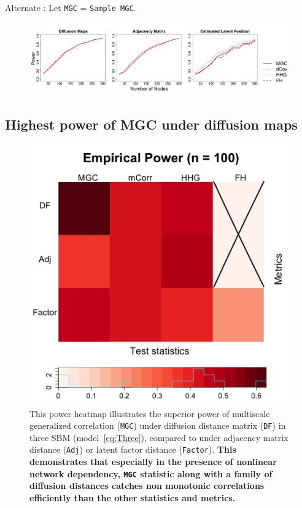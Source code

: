 \documentclass[12pt]{article}
\begin{document}
Alternate : Let \texttt{MGC} = \texttt{Sample MGC}. 

\begin{figure}[h]
	\centering
\includegraphics[width=\linewidth]{../Figure/twoSBM_simple.pdf}	
\end{figure}


\newpage
\subsection*{Highest power of MGC under diffusion maps}

\begin{figure}
	\centering
	\includegraphics[width=0.38\paperwidth, height=0.33\paperwidth]{../Figure/ThreeSBM_results_simple.png}
	\caption{This power heatmap illustrates the superior power of multiscale generalized correlation (\texttt{MGC}) under diffusion distance matrix (\texttt{DF}) in three SBM (model~\ref{eq:Three}), compared to under adjacency matrix distance (\texttt{Adj}) or latent factor distance (\texttt{Factor}). \textbf{This demonstrates that especially in the presence of nonlinear network dependency, \texttt{MGC} statistic along with a family of diffusion distances catches non monotonic correlations efficiently than the other statistics and metrics.}}
	\label{fig:threeSBM}
\end{figure}
\end{document}
